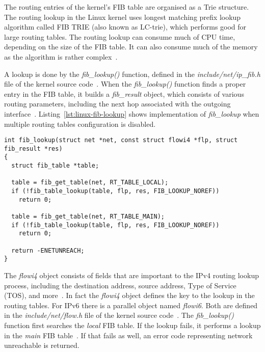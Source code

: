 The routing entries of the kernel's FIB table are organised as a Trie structure.
The routing lookup in the Linux kernel uses longest matching prefix lookup algorithm
called FIB TRIE (also known as LC-trie), which performs good for large routing tables.
The routing lookup can consume much of CPU time, depending on the size of the FIB table.
It can also consume much of the memory as the algorithm is rather complex~\cite{linux-kernel-networking}.

A lookup is done by the {\it{fib\_lookup()}} function, defined in the {\it{include/net/ip\_fib.h}} file
of the kernel source code~\cite{kernel-source}.
When the {\it{fib\_lookup()}} function finds a proper entry in the FIB table,
it builds a {\it{fib\_result}} object, which consists of various routing parameters,
including the next hop associated with the outgoing interface~\cite{linux-kernel-networking}.
Listing~\ref{lst:linux-fib-lookup} shows implementation of {\it{fib\_lookup}} when
multiple routing tables configuration is disabled.

\bigskip
\begin{lstlisting}[caption={Implementation of the fib\_lookup() function},label={lst:linux-fib-lookup}]
int fib_lookup(struct net *net, const struct flowi4 *flp, struct fib_result *res)
{
  struct fib_table *table;

  table = fib_get_table(net, RT_TABLE_LOCAL);
  if (!fib_table_lookup(table, flp, res, FIB_LOOKUP_NOREF))
    return 0;

  table = fib_get_table(net, RT_TABLE_MAIN);
  if (!fib_table_lookup(table, flp, res, FIB_LOOKUP_NOREF))
    return 0;

  return -ENETUNREACH;
}
\end{lstlisting}

The {\it{flowi4}} object consists of fields that are important to the IPv4 routing lookup process, including the
destination address, source address, Type of Service (TOS), and more~\cite{linux-kernel-networking}.
In fact the {\it{flowi4}} object defines the key to the lookup in the routing tables.
For IPv6 there is a parallel object named {\it{flowi6}}.
Both are defined in the {\it{include/net/flow.h}} file of the kernel source code~\cite{kernel-source}.
The {\it{fib\_lookup()}} function first searches the {\it{local}} FIB table.
If the lookup fails, it performs a lookup in the {\it{main}} FIB table~\cite{linux-kernel-networking}.
If that fails as well, an error code representing network unreachable is returned.

